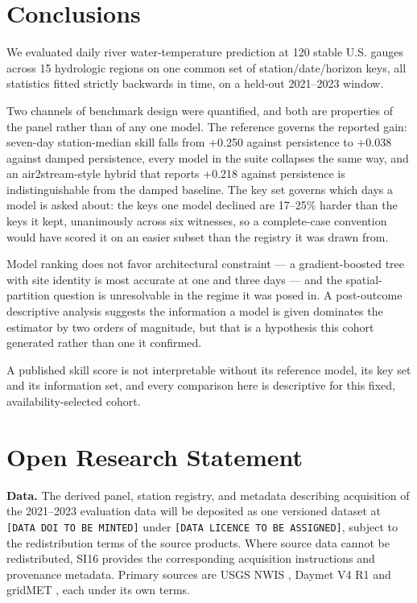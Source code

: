 \section{Conclusions}\label{conclusions}

We evaluated daily river water-temperature prediction at 120 stable U.S. gauges
across 15 hydrologic regions on one common set of station/\allowbreak date/\allowbreak horizon keys, all
statistics fitted strictly backwards in time, on a held-out 2021--2023 window.

Two channels of benchmark design were quantified, and both are properties of the
panel rather than of any one model. The reference governs the reported gain:
seven-day station-median skill falls from +0.250 against persistence to +0.038
against damped persistence, every model in the suite collapses the same way, and
an air2stream-style hybrid that reports +0.218 against persistence is
indistinguishable from the damped baseline. The key set governs which days a
model is asked about: the keys one model declined are 17--25\% harder than the
keys it kept, unanimously across six witnesses, so a complete-case convention
would have scored it on an easier subset than the registry it was drawn from.

Model ranking does not favor architectural constraint --- a gradient-boosted tree
with site identity is most accurate at one and three days --- and the
spatial-partition question is unresolvable in the regime it was posed in. A
post-outcome descriptive analysis suggests the information a model is given
dominates the estimator by two orders of magnitude, but that is a hypothesis
this cohort generated rather than one it confirmed.

A published skill score is not interpretable without its reference model, its
key set and its information set, and every comparison here is descriptive for
this fixed, availability-selected cohort.

\section*{Open Research Statement}

\textbf{Data.} The derived panel, station registry, and metadata describing
acquisition of the 2021--2023 evaluation data will be deposited as one versioned
dataset at \texttt{{[}DATA\ \allowbreak{}DOI\ \allowbreak{}TO\ \allowbreak{}BE\ \allowbreak{}MINTED{]}} under \texttt{{[}DATA\ \allowbreak{}LICENCE\ \allowbreak{}TO\ \allowbreak{}BE\ \allowbreak{}ASSIGNED{]}},
subject to the redistribution terms of the source products. Where source data
cannot be redistributed, SI16 provides the corresponding acquisition
instructions and provenance metadata. Primary sources are USGS NWIS
\cite{usgs2024nwis}, Daymet V4 R1
\cite{thornton2022daymet} and gridMET
\cite{abatzoglou2013development}, each under its own terms.

